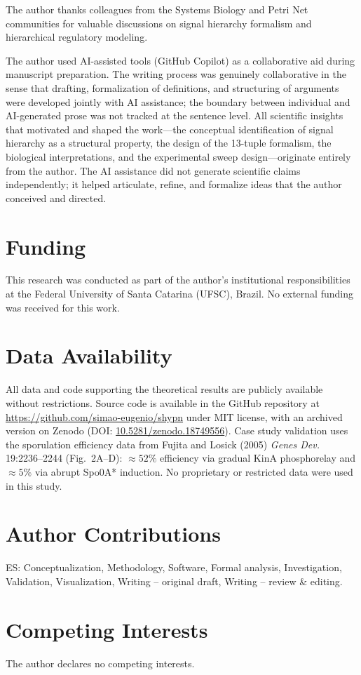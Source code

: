 \documentclass[10pt,letterpaper]{article}
\begin{document}
The author thanks colleagues from the Systems Biology and Petri Net communities for valuable discussions on signal hierarchy formalism and hierarchical regulatory modeling.

The author used AI-assisted tools (GitHub Copilot) as a collaborative aid during
manuscript preparation. The writing process was genuinely collaborative in the
sense that drafting, formalization of definitions, and structuring of arguments
were developed jointly with AI assistance; the boundary between individual and
AI-generated prose was not tracked at the sentence level. All scientific insights
that motivated and shaped the work---the conceptual identification of signal
hierarchy as a structural property, the design of the 13-tuple formalism, the
biological interpretations, and the experimental sweep design---originate
entirely from the author. The AI assistance did not generate scientific claims
independently; it helped articulate, refine, and formalize ideas that the author
conceived and directed.

\section*{Funding}

This research was conducted as part of the author's institutional responsibilities at the Federal University of Santa Catarina (UFSC), Brazil. No external funding was received for this work.

\section*{Data Availability}

All data and code supporting the theoretical results are publicly available without restrictions. Source code is available in the GitHub repository at \url{https://github.com/simao-eugenio/shypn} under MIT license, with an archived version on Zenodo (DOI: \href{https://doi.org/10.5281/zenodo.18749556}{10.5281/zenodo.18749556}). Case study validation uses the sporulation efficiency data from Fujita and Losick (2005) \textit{Genes Dev.} 19:2236--2244 (Fig.~2A--D): $\approx 52\%$ efficiency via gradual KinA phosphorelay and $\approx 5\%$ via abrupt Spo0A* induction. No proprietary or restricted data were used in this study.

\section*{Author Contributions}

ES: Conceptualization, Methodology, Software, Formal analysis, Investigation, Validation, Visualization, Writing -- original draft, Writing -- review \& editing.

\section*{Competing Interests}

The author declares no competing interests.



\end{document}
